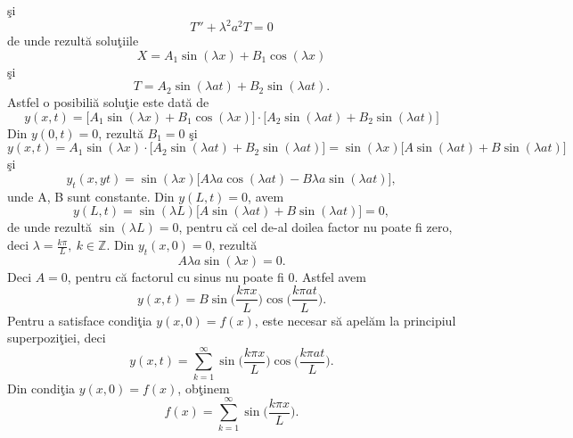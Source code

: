 \documentclass[a4paper,openany,12pt]{report}
\begin{document}
\c si 
\begin{equation*}
T''+\lambda^2 a^2 T=0
\end{equation*}
de unde rezult\u a solu\c tiile
\begin{equation*}
X=A_1 \sin(\lambda x)+B_1 \cos(\lambda x)
\end{equation*}
\c si 
\begin{equation*}
T= A_2 \sin(\lambda a t)+B_2 \sin(\lambda a t).
\end{equation*}
Astfel o posibili\u a solu\c tie este dat\u a de
\begin{equation*}
y(x,t)= \big[A_1 \sin(\lambda x)+B_1 \cos(\lambda x)\big] \cdot \big[A_2 \sin(\lambda a t)+B_2 \sin(\lambda a t)\big] 
\end{equation*}
Din $y(0,t)=0$, rezult\u a $B_1=0$ \c si 
\begin{equation*}
y(x,t)= A_1 \sin(\lambda x)\cdot \big[A_2 \sin(\lambda a t)+B_2 \sin(\lambda a t)\big]= \sin(\lambda x)\big[A \sin(\lambda a t)+B \sin(\lambda a t)\big]
\end{equation*}
\c si 
\begin{equation*}
y_t(x,yt)=\sin(\lambda x)\big[ A\lambda a\cos(\lambda at)-B\lambda a \sin(\lambda at) \big],
\end{equation*}
unde A, B sunt constante. 
\newline
Din $y(L,t)=0$, avem 
\begin{equation*}
y(L,t)=\sin(\lambda L)\big[A \sin(\lambda a t)+B \sin(\lambda a t)\big] =0, 
\end{equation*}
de unde rezult\u a $\sin(\lambda L)=0$, pentru c\u a cel de-al doilea factor nu poate fi zero, deci $\lambda=\frac{k\pi}{L},\: k\in \mathbb{Z}$. Din $y_t(x,0)=0$, rezult\u a
\begin{equation*}
A\lambda a\sin(\lambda x)=0.
\end{equation*}
Deci $A=0$, pentru c\u a factorul cu sinus nu poate fi 0. Astfel avem
\begin{equation*}
y(x,t)=B\sin\Big(\frac{k\pi x}{L}\Big)\cos\Big(\frac{k \pi a t}{L}\Big).
\end{equation*}
Pentru a satisface condi\c tia $y(x,0)=f(x)$, este necesar s\u a apel\u am la principiul superpozi\c tiei, deci
\begin{equation*}
y(x,t)=\sum_{k=1}^\infty\sin\Big(\frac{k\pi x}{L}\Big)\cos\Big(\frac{k \pi a t}{L}\Big).
\end{equation*}
Din condi\c tia $y(x,0)=f(x)$, ob\c tinem
\begin{equation*}
f(x)=\sum_{k=1}^\infty\sin\Big(\frac{k\pi x}{L}\Big).
\end{equation*}
\end{document}
